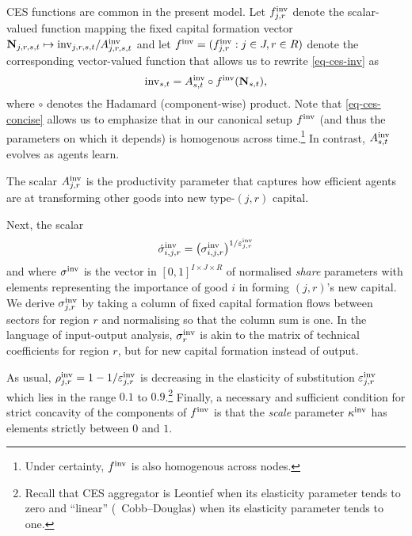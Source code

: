 \documentclass[12pt,a4paper,twoside, draft]{article}
\begin{document}
\begin{remark*}
  CES functions are common in the present
  model. 
  Let $f_{j, r}^{\textup{inv}}$ denote the scalar-valued
  function mapping the fixed capital formation vector
  $ \mathbf{N}_{j, r, {s}, t} \mapsto
  \textup{inv}_{j, r, {s}, t} / A_{j, r, {s}, t}^{\textup{inv}}$
  and let $f^{\textup{inv}} = (f_{j, r}^{\textup{inv}}: j \in J, r \in R )$
  denote the corresponding vector-valued function that allows us to rewrite
  \eqref{eq-ces-inv} as
  \begin{equation}\label{eq-ces-concise}
  \textup{inv}_{{s}, t} = A_{{s}, t}^{\textup{inv}}
    \circ f^{\textup{inv}}(\mathbf{N}_{{s}, t}),
  \end{equation}
  where $\circ$ denotes the Hadamard (component-wise) product.
  Note that \eqref{eq-ces-concise} allows us to emphasize that in our canonical
  setup $f^{\textup{inv}}$ (and thus the parameters on which it depends) is
  homogenous across time.\footnote{
    Under certainty, $f^{\textup{inv}}$ is also homogenous across nodes.
  }
  In contrast, $A_{{s}, t}^{\textup{inv}}$ evolves as agents learn.
\end{remark*}
The scalar $A_{j, r}^{\textup{inv}}$ is the productivity parameter that captures
how efficient agents are at transforming other goods into new type-$(j,r)$
capital.

Next, the scalar
\[
  \acute \sigma_{i,j, r}^{\textup{inv}}
  = \left( \sigma_{i,j, r}^{\textup{inv}} \right)
    ^ {1 / \varepsilon_{j, r}^{\textup{inv}}}
\]
and where $\sigma^{\textup{inv}}$ is the vector in
$[0, 1]^{I \times J \times R}$ of normalised \emph{share} parameters with
elements representing the importance of good $i$ in forming $(j, r)$'s new
capital.
We derive $\sigma_{j, r}^{\textup{inv}}$ by taking a column of fixed capital
formation flows between sectors for region $r$ and normalising so that the
column sum is one.
In the language of input-output analysis, $\sigma_{r}^{\textup{inv}}$ is akin
to the matrix of technical coefficients for region $r$, but for new capital
formation instead of output.

As usual,
$\rho_{j, r}^{\textup{inv}} = 1 - 1 / \varepsilon_{j, r}^{\textup{inv}}$ is
decreasing in the elasticity of substitution $\varepsilon_{j, r}^{\textup{inv}}$
which lies in the range $ 0.1 $ to $0.9$.\footnote{
  Recall that CES aggregator is Leontief when its elasticity
  parameter tends to zero and ``linear'' (\ie\ Cobb--Douglas) when its
  elasticity parameter tends to one.
}
Finally, a necessary and sufficient condition
\citep[Theorem 2]{Kojic-Concavity} for strict concavity of the
components of $f^{\textup{inv}}$ is that the \emph{scale} parameter
$\kappa^\textup{inv}$ has elements strictly between $0$ and $1$.
\end{document}
